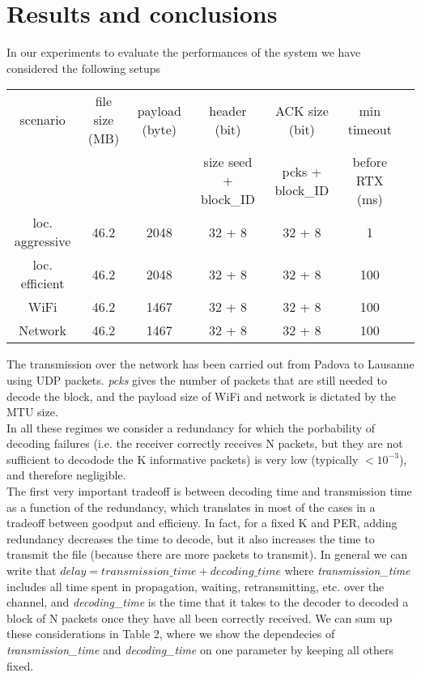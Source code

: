 \section{Results and conclusions}
\setlength{\abovecaptionskip}{0pt plus 0pt minus 2pt}



In our experiments to evaluate the performances of the system we have considered the following setups
\begin{center}
\begin{tabular}{ccccccc}

\toprule
scenario&file size (MB)& payload (byte) &header  (bit) &ACK size (bit)&min timeout\\
& & &size seed + block\_ID&pcks + block\_ID& before RTX (ms) \\
\midrule
loc. aggressive&46.2&2048&32 + 8&32 + 8&1\\
loc. efficient&46.2&2048&32 + 8&32 + 8&100\\
WiFi&46.2&1467&32 + 8&32 + 8&100\\
Network&46.2&1467&32 + 8&32 + 8&100\\
\bottomrule
\end{tabular}
\end{center}
The transmission over the network has been carried out from Padova to Lausanne using UDP packets. \emph{pcks} gives the number of packets that are still needed to decode the block, and the payload size of WiFi and network is dictated by the MTU size. \\
In all these regimes we consider a redundancy for which the porbability of decoding failures (i.e. the receiver correctly receives N packets, but they are not sufficient to decodode the K informative packets) is very low (typically $<10^{-3}$), and therefore negligible. \\
The first very important tradeoff is between decoding time and transmission time as a function of the redundancy, which translates in most of the cases in a tradeoff between goodput and efficieny. In fact, for a fixed K and PER, adding redundancy decreases the time to decode, but it also increases the time to transmit the file (because there are more packets to transmit). In general we can write that $delay=transmission\_time+decoding\_time$ where \emph{transmission\_time} includes all time spent in propagation, waiting, retransmitting, etc. over the channel, and \emph{decoding\_time} is the time that it takes to the decoder to decoded a block of N packets once they have all been correctly received. We can sum up these considerations in Table 2, where we show the dependecies of \emph{transmission\_time} and \emph{decoding\_time} on one parameter by keeping all others fixed.
